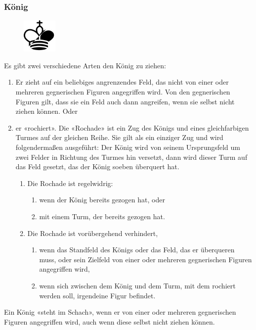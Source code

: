\documentclass[a4paper, 10pt]{scrartcl}
\begin{document}
\subsubsection*{König}

\begin{figure}
        \includegraphics[width=0.15\textwidth, right]{assets/king_split.png}
\end{figure}
Es gibt zwei verschiedene Arten den König zu ziehen:
\begin{enumerate}
        \item Er zieht auf ein beliebiges angrenzendes Feld, das nicht von einer oder mehreren gegnerischen Figuren angegriffen wird. Von den gegnerischen Figuren gilt, dass sie ein Feld auch dann angreifen, wenn sie selbst nicht ziehen können. Oder
        \item er «rochiert». Die «Rochade» ist ein Zug des Königs und eines gleichfarbigen Turmes auf der gleichen Reihe. Sie gilt als ein einziger Zug und wird folgendermaßen ausgeführt: Der König wird von seinem Ursprungsfeld um zwei Felder in Richtung des Turmes hin versetzt, dann wird dieser Turm auf das Feld gesetzt, das der König soeben überquert hat.
        \begin{enumerate}
                \item Die Rochade ist regelwidrig:
                \begin{enumerate}
                        \item wenn der König bereits gezogen hat, oder
                        \item mit einem Turm, der bereits gezogen hat.
                \end{enumerate}
                \item Die Rochade ist vorübergehend verhindert,
                \begin{enumerate}
                        \item wenn das Standfeld des Königs oder das Feld, das er überqueren muss, oder sein Zielfeld von einer oder mehreren gegnerischen Figuren angegriffen wird,
                        \item wenn sich zwischen dem König und dem Turm, mit dem rochiert werden soll, irgendeine Figur befindet.
                \end{enumerate}
        \end{enumerate}
\end{enumerate}
Ein König «steht im Schach», wenn er von einer oder mehreren gegnerischen Figuren angegriffen wird, auch wenn diese selbst nicht ziehen können.
\end{document}
